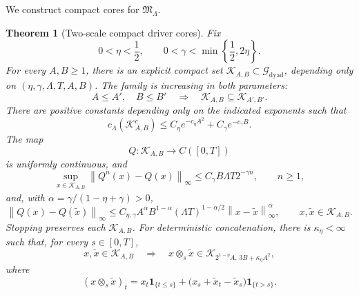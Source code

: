 \documentclass[11pt,reqno]{amsart}
\theoremstyle{plain}
\newtheorem{theorem}{Theorem}[section]
\theoremstyle{definition}
\newcommand{\cG}{\mathcal G}
\newcommand{\cK}{\mathcal K}
\newcommand{\one}{\mathbf 1}
\newcommand{\norm}[1]{\left\lVert #1\right\rVert}
\begin{document}
We construct compact cores for \(\mathfrak M_\Lambda\).

\begin{theorem}[Two-scale compact driver cores]
\label{thm:driver-core}
Fix
\begin{equation}\label{eq:eta-beta-choice}
  0<\eta<\frac12,
  \qquad
  0<\gamma<\min\left\{\frac12,2\eta\right\}.
\end{equation}
For every \(A,B\ge1\), there is an explicit compact set
\(\cK_{A,B}\subset\cG_{\mathrm{dyad}}\), depending only on
\((\eta,\gamma,\Lambda,T,A,B)\).  The family is increasing in both
parameters:
\[
  A\le A',\quad B\le B'
  \quad\Longrightarrow\quad
  \cK_{A,B}\subseteq\cK_{A',B'}.
\]
There are positive constants depending only on the indicated exponents such
that
\begin{equation}\label{eq:two-scale-capacity}
  c_\Lambda(\cK_{A,B}^c)
  \le C_\eta e^{-c_\eta A^2}+C_\gamma e^{-c_\gamma B}.
\end{equation}
The map
\[
  Q:\cK_{A,B}\longrightarrow C([0,T])
\]
is uniformly continuous, and
\begin{equation}\label{eq:two-scale-qv-rate}
  \sup_{x\in\cK_{A,B}}\norm{Q^n(x)-Q(x)}_\infty
  \le C_\gamma B\Lambda T2^{-\gamma n},
  \qquad n\ge1,
\end{equation}
and, with \(\alpha=\gamma/(1-\eta+\gamma)>0\),
\begin{equation}\label{eq:two-scale-qv-modulus}
  \norm{Q(x)-Q(\widetilde x)}_\infty
  \le C_{\eta,\gamma}A^\alpha B^{1-\alpha}
       (\Lambda T)^{1-\alpha/2}
       \norm{x-\widetilde x}_\infty^\alpha,
  \qquad x,\widetilde x\in\cK_{A,B}.
\end{equation}
Stopping preserves each \(\cK_{A,B}\).  For deterministic concatenation,
there is \(\kappa_\eta<\infty\) such that, for every \(s\in[0,T]\),
\begin{equation}\label{eq:two-scale-concatenation}
  x,\widetilde x\in\cK_{A,B}
  \quad\Longrightarrow\quad
  x\otimes_s\widetilde x
  \in\cK_{2^{1-\eta}A,\,3B+\kappa_\eta A^2},
\end{equation}
where
\[
  (x\otimes_s\widetilde x)_t
  =x_t\one_{\{t\le s\}}
   +\bigl(x_s+\widetilde x_t-\widetilde x_s\bigr)
      \one_{\{t>s\}}.
\]

\end{theorem}
\end{document}
